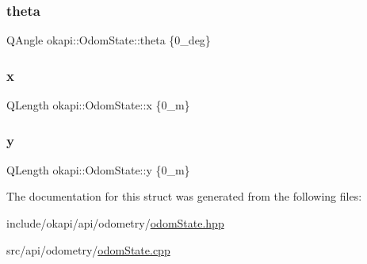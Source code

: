 \subsubsection{\texorpdfstring{theta}{theta}}
{\footnotesize\ttfamily Q\+Angle okapi\+::\+Odom\+State\+::theta \{0\+\_\+deg\}}

\mbox{\label{structokapi_1_1OdomState_a53fbbb483d5073e703517745d769eb45}} 
\subsubsection{\texorpdfstring{x}{x}}
{\footnotesize\ttfamily Q\+Length okapi\+::\+Odom\+State\+::x \{0\+\_\+m\}}

\mbox{\label{structokapi_1_1OdomState_afcb08739959ad3afb7941a0bd59bcbb6}} 
\subsubsection{\texorpdfstring{y}{y}}
{\footnotesize\ttfamily Q\+Length okapi\+::\+Odom\+State\+::y \{0\+\_\+m\}}



The documentation for this struct was generated from the following files\+:\begin{DoxyCompactItemize}
\item 
include/okapi/api/odometry/\mbox{\hyperlink{odomState_8hpp}{odom\+State.\+hpp}}\item 
src/api/odometry/\mbox{\hyperlink{odomState_8cpp}{odom\+State.\+cpp}}\end{DoxyCompactItemize}
